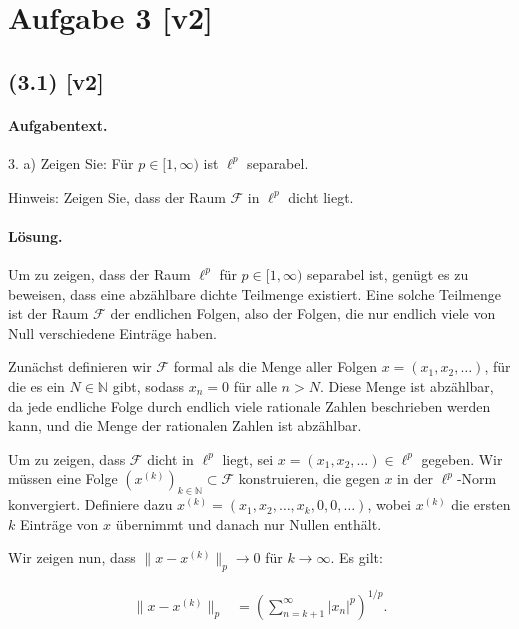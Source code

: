 \documentclass[11pt,a4paper]{article}
\begin{document}

\section*{Aufgabe 3 [v2]}
\subsection*{(3.1) [v2]}
\paragraph{Aufgabentext.}
3. a) Zeigen Sie: Für $p \in[1, \infty)$ ist $\ell^p$ separabel.

Hinweis: Zeigen Sie, dass der Raum $\mathcal{F}$ in $\ell^p$ dicht liegt.

\paragraph{Lösung.}
Um zu zeigen, dass der Raum $\ell^p$ für $p \in [1, \infty)$ separabel ist, genügt es zu beweisen, dass eine abzählbare dichte Teilmenge existiert. Eine solche Teilmenge ist der Raum $\mathcal{F}$ der endlichen Folgen, also der Folgen, die nur endlich viele von Null verschiedene Einträge haben.

Zunächst definieren wir $\mathcal{F}$ formal als die Menge aller Folgen $x = (x_1, x_2, \ldots)$, für die es ein $N \in \mathbb{N}$ gibt, sodass $x_n = 0$ für alle $n > N$. Diese Menge ist abzählbar, da jede endliche Folge durch endlich viele rationale Zahlen beschrieben werden kann, und die Menge der rationalen Zahlen ist abzählbar.

Um zu zeigen, dass $\mathcal{F}$ dicht in $\ell^p$ liegt, sei $x = (x_1, x_2, \ldots) \in \ell^p$ gegeben. Wir müssen eine Folge $(x^{(k)})_{k \in \mathbb{N}} \subset \mathcal{F}$ konstruieren, die gegen $x$ in der $\ell^p$-Norm konvergiert. Definiere dazu $x^{(k)} = (x_1, x_2, \ldots, x_k, 0, 0, \ldots)$, wobei $x^{(k)}$ die ersten $k$ Einträge von $x$ übernimmt und danach nur Nullen enthält.

Wir zeigen nun, dass $\|x - x^{(k)}\|_p \to 0$ für $k \to \infty$. Es gilt:

\begin{align*}
\|x - x^{(k)}\|_p &= \left( \sum_{n=k+1}^{\infty} |x_n|^p \right)^{1/p}.
\end{align*}
\end{document}
